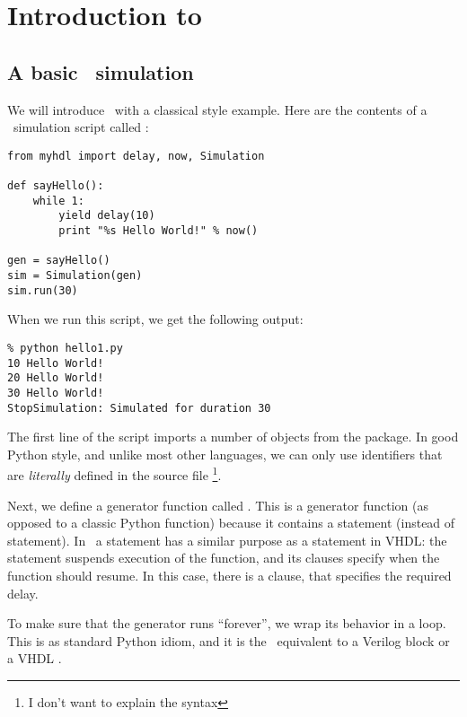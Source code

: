 \chapter{Introduction to \myhdl\ }

\section{A basic \myhdl\ simulation}

We will introduce \myhdl\ with a classical  style
example. Here are the contents of a \myhdl\ simulation script called
:

\begin{verbatim}
from myhdl import delay, now, Simulation

def sayHello():
    while 1:
        yield delay(10)
        print "%s Hello World!" % now()

gen = sayHello()
sim = Simulation(gen)
sim.run(30)

\end{verbatim}

When we run this script, we get the following output: 

\begin{verbatim}
% python hello1.py
10 Hello World!
20 Hello World!
30 Hello World!
StopSimulation: Simulated for duration 30

\end{verbatim}

The first line of the script imports a
number of objects from the  package. In good Python style, and
unlike most other languages, we can only use identifiers that are
\emph{literally} defined in the source file \footnote{I don't want to
explain the  syntax}.

Next, we define a generator function called
. This is a generator function (as opposed to
a classic Python function) because it contains a 
statement (instead of  statement). In \myhdl\, a
 statement has a similar purpose as a 
statement in VHDL: the statement suspends execution of the function,
and its clauses specify when the function should resume. In this case,
there is a  clause, that specifies the required delay.

To make sure that the generator runs ``forever'', we wrap its behavior
in a  loop. This is as standard Python idiom, and it is
the \myhdl\ equivalent to a Verilog  block or a
VHDL .

